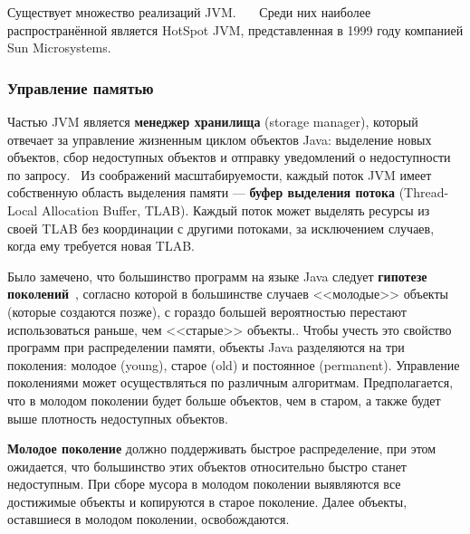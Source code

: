 Существует множество реализаций JVM.~\cite{java_j9}~\cite{java_codename_one}~\cite{java_graalvm}
Среди них наиболее распространённой является HotSpot JVM, представленная в 1999 году компанией Sun Microsystems.~\cite{java_hotspot} %



\subsubsection*{Управление памятью}
\label{generations}

Частью JVM является \textbf{менеджер хранилища} (storage manager), который отвечает за управление жизненным циклом объектов Java: выделение новых объектов, сбор недоступных объектов и отправку уведомлений о недоступности по запросу.~\cite{java_storage_management} Из соображений масштабируемости, каждый поток JVM имеет собственную область выделения памяти --- \textbf{буфер выделения потока} (Thread-Local Allocation Buffer, TLAB). Каждый поток может выделять ресурсы из своей TLAB без координации с другими потоками, за исключением случаев, когда ему требуется новая TLAB.~\cite{java_storage_management}

Было замечено, что большинство программ на языке Java следует \textbf{гипотезе поколений}~\cite{handbook}, согласно которой в большинстве случаев <<молодые>> объекты (которые создаются позже), с гораздо большей вероятностью перестают использоваться раньше, чем <<старые>> объекты.. Чтобы учесть это свойство программ при распределении памяти, объекты Java разделяются на три поколения: молодое (young), старое (old) и постоянное (permanent). Управление поколениями может осуществляться по различным алгоритмам. Предполагается, что в молодом поколении будет больше объектов, чем в старом, а также будет выше плотность недоступных объектов.~\cite{java_storage_management}

\textbf{Молодое поколение} должно поддерживать быстрое распределение, при этом ожидается, что большинство этих объектов относительно быстро станет недоступным. При сборе мусора в молодом поколении выявляются все достижимые объекты и копируются в старое поколение. Далее объекты, оставшиеся в молодом поколении, освобождаются.~\cite{java_storage_management}

